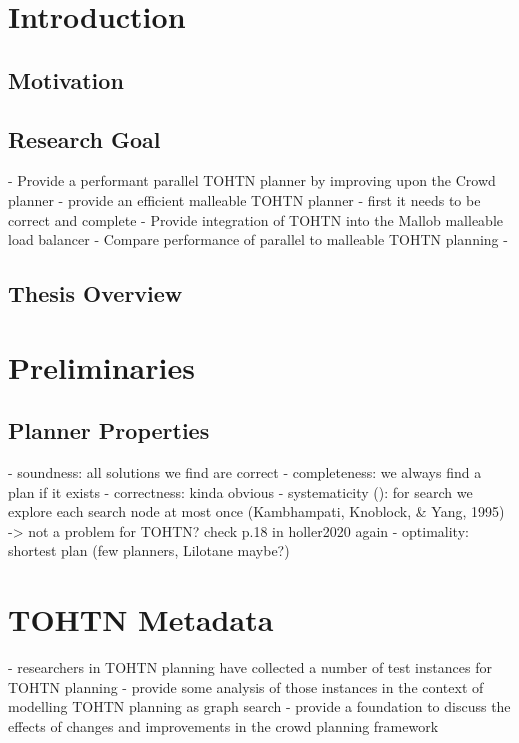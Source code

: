 \documentclass[enabledeprecatedfontcommands,12pt,a4paper,twoside]{scrartcl}
\numberwithin{equation}{section}
\begin{document}
\listoffigures
\listoftables
\listofalgorithms

\clearpage


\section{Introduction}
\subsection{Motivation}

\subsection{Research Goal}
- Provide a performant parallel TOHTN planner by improving upon the Crowd planner
- provide an efficient malleable TOHTN planner
	- first it needs to be correct and complete
- Provide integration of TOHTN into the Mallob malleable load balancer
- Compare performance of parallel to malleable TOHTN planning
- 
\subsection{Thesis Overview}


\section{Preliminaries}

\subsection{Planner Properties}
- soundness: all solutions we find are correct
- completeness: we always find a plan if it exists
- correctness: kinda obvious
- systematicity (\cite{holler2020htn}): for search we explore each search node at most once (Kambhampati, Knoblock, \& Yang, 1995) -> not a problem for TOHTN? check p.18 in holler2020 again
- optimality: shortest plan (few planners, Lilotane maybe?)







\section{TOHTN Metadata}
- researchers in TOHTN planning have collected a number of test instances for TOHTN planning
- provide some analysis of those instances in the context of modelling TOHTN planning as graph search
- provide a foundation to discuss the effects of changes and improvements in the crowd planning framework
\end{document}
